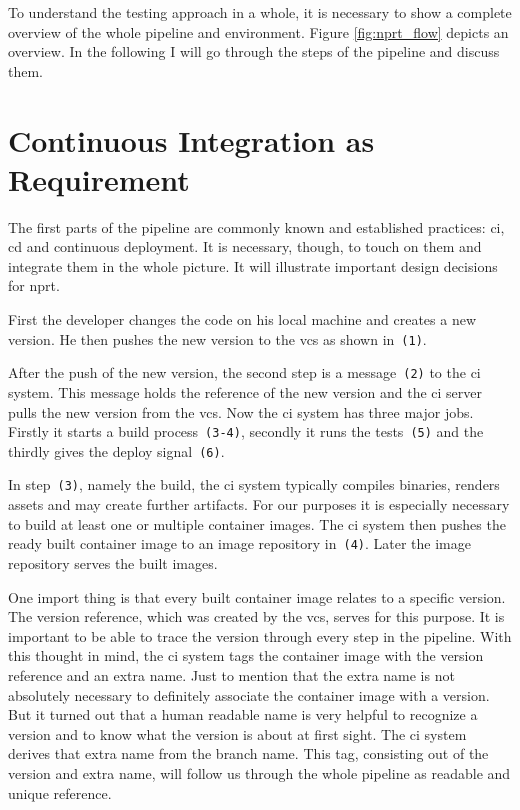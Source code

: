 To understand the testing approach in a whole, it is necessary to show a complete overview
of the whole pipeline and environment. Figure \ref{fig:nprt_flow} depicts an overview. In
the following I will go through the steps of the pipeline and discuss them.

\section{Continuous Integration as Requirement}

The first parts of the pipeline are commonly known and established practices: \gls{ci},
\gls{cd} and continuous deployment. It is necessary, though, to touch on them and
integrate them in the whole picture. It will illustrate important design decisions for
\gls{nprt}.

First the developer changes the code on his local machine and creates a new version. He
then pushes the new version to the \gls{vcs} as shown in~\texttt{(1)}.

After the push of the new version, the second step is a message~\texttt{(2)} to the
\gls{ci} system. This message holds the reference of the new version and the \gls{ci}
server pulls the new version from the \gls{vcs}. Now the \gls{ci} system has three major
jobs. Firstly it starts a build process~\texttt{(3-4)}, secondly it runs the
tests~\texttt{(5)} and the thirdly gives the deploy signal~\texttt{(6)}.

In step~\texttt{(3)}, namely the build, the \gls{ci} system typically compiles binaries,
renders assets and may create further artifacts. For our purposes it is especially
necessary to build at least one or multiple container images. The \gls{ci} system then
pushes the ready built container image to an image repository in~\texttt{(4)}. Later the
image repository serves the built images.

One import thing is that every built container image relates to a specific version. The
version reference, which was created by the \gls{vcs}, serves for this purpose. It is
important to be able to trace the version through every step in the pipeline. With this
thought in mind, the \gls{ci} system tags the container image with the version reference
and an extra name. Just to mention that the extra name is not absolutely necessary to
definitely associate the container image with a version. But it turned out that a human
readable name is very helpful to recognize a version and to know what the version is about
at first sight. The \gls{ci} system derives that extra name from the branch name. This
tag, consisting out of the version and extra name, will follow us through the whole
pipeline as readable and unique reference.

